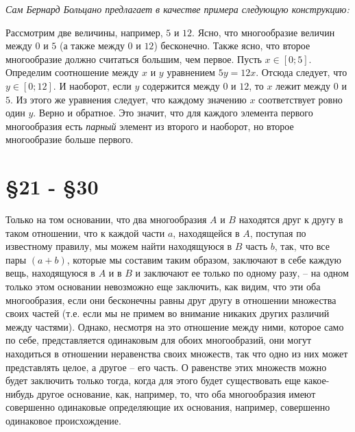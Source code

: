 \documentclass[12pt]{extarticle}
\begin{document}
\textit{Сам Бернард Больцано предлагает в качестве примера следующую конструкцию:}

Рассмотрим две величины, например, $5$ и $12$. Ясно, что многообразие величин между $0$ и $5$ (а также между $0$ и $12$) бесконечно.
Также ясно, что второе многообразие должно считаться большим, чем первое. Пусть $x \in [0; 5]$. Определим соотношение между $x$ и $y$ уравнением $5y = 12x$. Отсюда следует, что $y \in [0; 12]$. И наоборот, если $y$ содержится между $0$ и $12$, то $x$ лежит между $0$ и $5$. Из этого же уравнения следует, что каждому значению $x$ соответствует ровно один $y$. Верно и обратное. Это значит, что для каждого элемента первого многообразия есть \textit{парный} элемент из второго и наоборот, но второе многообразие больше первого. 

\section{\S 21 - \S 30}

Только на том основании, что два многообразия $A$ и $B$ находятся друг к другу в таком отношении, что к каждой части $a$, находящейся в $A$, поступая по известному правилу, мы можем найти находящуюся в $B$ часть $b$, так, что все пары $(a + b)$, которые мы составим таким образом, заключают в себе каждую вещь, находящуюся в $A$ и в $B$ и заключают ее только по одному разу, – на одном только этом основании невозможно еще заключить, как видим, что эти оба многообразия, если они бесконечны равны друг другу  в отношении множества своих частей (т.е. если мы не примем во внимание никаких других различий между частями). 
Однако, несмотря на это отношение между ними, которое само по себе, представляется одинаковым для обоих многообразий, они могут находиться в отношении неравенства своих множеств, так что одно из них может представлять целое, а другое – его часть. О равенстве этих множеств можно будет заключить только тогда, когда для этого будет существовать еще какое-нибудь другое основание, как, например, то, что оба многообразия имеют совершенно одинаковые определяющие их основания, например, совершенно одинаковое происхождение.
\end{document}

